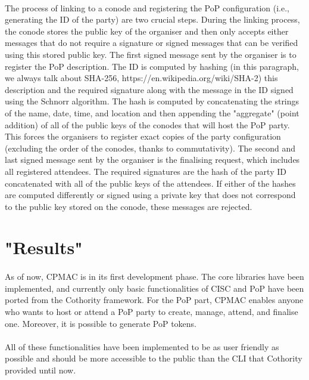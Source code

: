 \paragraph{}
The process of linking to a conode and registering the PoP configuration (i.e., generating the ID of the party) are two crucial steps. During the linking process, the conode stores the public key of the organiser and then only accepts either messages that do not require a signature or signed messages that can be verified using this stored public key. The first signed message sent by the organiser is to register the PoP description. The ID is computed by hashing (in this paragraph, we always talk about SHA-256, https://en.wikipedia.org/wiki/SHA-2) this description and the required signature along with the message in the ID signed using the Schnorr algorithm. The hash is computed by concatenating the strings of the name, date, time, and location and then appending the "aggregate" (point addition) of all of the public keys of the conodes that will host the PoP party. This forces the organisers to register exact copies of the party configuration (excluding the order of the conodes, thanks to commutativity). The second and last signed message sent by the organiser is the finalising request, which includes all registered attendees. The required signatures are the hash of the party ID concatenated with all of the public keys of the attendees. If either of the hashes are computed differently or signed using a private key that does not correspond to the public key stored on the conode, these messages are rejected.

\section{"Results"}

\paragraph{}
As of now, CPMAC is in its first development phase. The core libraries have been implemented, and currently only basic functionalities of CISC and PoP have been ported from the Cothority framework. For the PoP part, CPMAC enables anyone who wants to host or attend a PoP party to create, manage, attend, and finalise one. Moreover, it is possible to generate PoP tokens.

\paragraph{}
All of these functionalities have been implemented to be as user friendly as possible and should be more accessible to the public than the CLI that Cothority provided until now.

